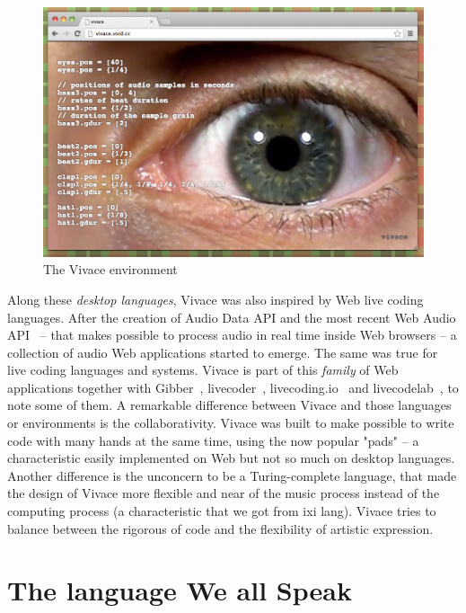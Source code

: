 \documentclass[letterpaper, 12pt]{article}
\begin{document}
\begin{figure}[htpb]
\begin{center}
\includegraphics[scale=.3]{img/fig_vivace.png}
\caption{The Vivace environment}
\label{fig:vivace}
\end{center}
\end{figure}

Along these \textit{desktop languages}, Vivace was also inspired by
Web live coding languages. After the creation of Audio Data API and
the most recent Web Audio API~\cite{webaudio} -- that makes possible
to process audio in real time inside Web browsers -- a collection of
audio Web applications started to emerge. The same was true for live
coding languages and systems. Vivace is part of this \textit{family}
of Web applications together with Gibber~\cite{gibber},
livecoder~\cite{livecoder}, livecoding.io~\cite{livecodingio} and
livecodelab~\cite{livecodelab}, to note some of them. A remarkable
difference between Vivace and those languages or environments is the
collaborativity. Vivace was built to make possible to write code with
many hands at the same time, using the now popular "pads" -- a
characteristic easily implemented on Web but not so much on desktop
languages. Another difference is the unconcern to be a Turing-complete
language, that made the design of Vivace more flexible and near of the
music process instead of the computing process (a characteristic that
we got from ixi lang). Vivace tries to balance between the rigorous of
code and the flexibility of artistic expression.

\section{The language We all Speak}
\end{document}
